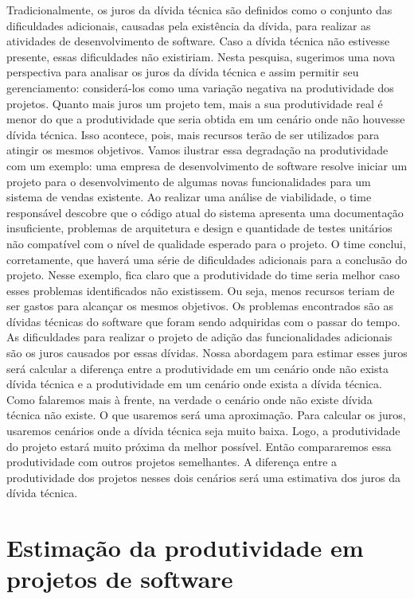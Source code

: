 Tradicionalmente, os juros da dívida técnica são definidos como o conjunto das dificuldades adicionais, causadas pela existência da dívida, para realizar as atividades de desenvolvimento de software. Caso a dívida técnica não estivesse presente, essas dificuldades não existiriam. Nesta pesquisa, sugerimos uma nova perspectiva para analisar os juros da dívida técnica e assim permitir seu gerenciamento: considerá-los como uma variação negativa na produtividade dos projetos. Quanto mais juros um projeto tem, mais a sua produtividade real é menor do que a produtividade que seria obtida em um cenário onde não houvesse dívida técnica. Isso acontece, pois, mais recursos terão de ser utilizados para atingir os mesmos objetivos. Vamos ilustrar essa  degradação na produtividade com um exemplo: uma empresa de desenvolvimento de software resolve iniciar um projeto para o desenvolvimento de algumas novas funcionalidades para um sistema de vendas existente. Ao realizar uma análise de viabilidade, o time responsável descobre que o código atual do sistema apresenta uma documentação insuficiente, problemas de arquitetura e design e quantidade de testes unitários não compatível com o nível de qualidade esperado para o projeto. O time conclui, corretamente, que haverá uma série de dificuldades adicionais para a conclusão do projeto. Nesse exemplo, fica claro que a produtividade do time seria melhor caso esses problemas identificados não existissem. Ou seja, menos recursos teriam de ser gastos para alcançar os mesmos objetivos. Os problemas encontrados são as dívidas técnicas do software que foram sendo adquiridas com o passar do tempo. As dificuldades para realizar o projeto de adição das funcionalidades adicionais são os juros causados por essas dívidas. Nossa abordagem para estimar esses juros será calcular a diferença entre a produtividade em um cenário onde não exista dívida técnica e a produtividade em um cenário onde exista a dívida técnica. Como falaremos mais à frente, na verdade o cenário onde não existe dívida técnica não existe. O que usaremos será uma aproximação. Para calcular os juros, usaremos cenários onde a dívida técnica seja muito baixa. Logo, a produtividade do projeto estará muito próxima da melhor possível. Então compararemos essa produtividade com outros projetos semelhantes. A diferença entre a produtividade dos projetos nesses dois cenários será uma estimativa dos juros da dívida técnica.


\section{Estimação da produtividade em projetos de software}
\label{modelo_de_estimacao_produtividade}

